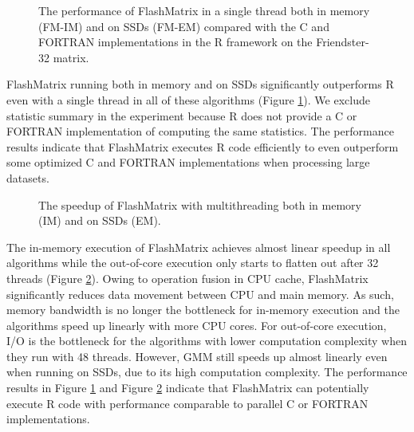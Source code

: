 \begin{figure}
	\begin{center}
		\footnotesize
		\vspace{-15pt}
		
		\vspace{-10pt}
		\caption{The performance of FlashMatrix in a single thread both in
			memory (FM-IM) and on SSDs (FM-EM) compared with the C and FORTRAN
		implementations in the R framework on the Friendster-32 matrix.}
		\label{fig:fmR}
	\end{center}
\end{figure}

FlashMatrix running both in memory and on SSDs significantly outperforms R
even with a single thread in all of these algorithms (Figure \ref{fig:fmR}).
We exclude statistic summary in the experiment because R does not provide
a C or FORTRAN implementation of computing the same statistics. The performance
results indicate that FlashMatrix executes R code efficiently to even outperform
some optimized C and FORTRAN implementations when processing large datasets.

\begin{figure}
	\begin{center}
		\footnotesize
		\vspace{-15pt}
		
		\vspace{-10pt}
		\caption{The speedup of FlashMatrix with multithreading both in memory (IM)
		and on SSDs (EM).}
		\label{fig:speedup}
	\end{center}
\end{figure}

The in-memory execution of FlashMatrix achieves almost linear speedup in all
algorithms while the out-of-core execution only
starts to flatten out after 32 threads (Figure \ref{fig:speedup}). Owing to
operation fusion in CPU cache, FlashMatrix significantly reduces data movement
between CPU and main memory. As such, memory bandwidth is no longer the bottleneck
for in-memory execution and the algorithms speed up linearly with more CPU cores.
For out-of-core execution, I/O is the bottleneck for the algorithms with
lower computation complexity when they run with 48 threads. However,
GMM still speeds up almost linearly even when running on SSDs, due to its high
computation complexity. The performance results in Figure \ref{fig:fmR} and Figure
\ref{fig:speedup} indicate that FlashMatrix can potentially execute R code with
performance comparable to parallel C or FORTRAN implementations.

